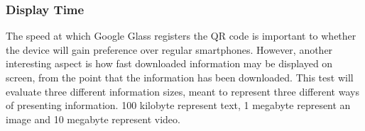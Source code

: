 		

\subsubsection{Display Time}
The speed at which Google Glass registers the QR code is important to whether the device will gain preference over regular smartphones. However, another interesting aspect is how fast downloaded information may be displayed on screen, from the point that the information has been downloaded. %
This test will evaluate three different information sizes, meant to represent three different ways of presenting information. 100 kilobyte represent text, 1 megabyte represent an image and 10 megabyte represent video.

       


